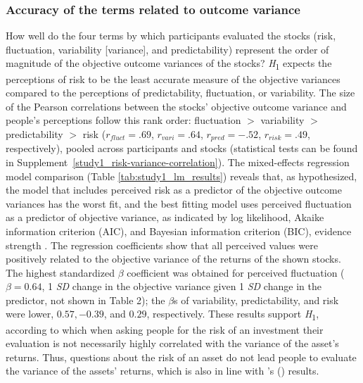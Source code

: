 \documentclass[a4paper,man, natbib,floatsintext]{apa6} %
\begin{document}
\subsubsection{Accuracy of the terms related to outcome variance}
How well do the four terms by which participants evaluated the stocks (risk, fluctuation, variability [variance], and  predictability) represent the order of magnitude of the objective outcome variances of the stocks? \textit{H}\textsubscript{1} expects the perceptions of risk to be the least accurate measure of the objective variances compared to the perceptions of predictability, fluctuation, or variability. The size of the Pearson correlations between the stocks' objective outcome variance and people's perceptions follow this rank order: fluctuation $>$ variability $>$ predictability $>$ risk ($r_{fluct}=.69$, $r_{vari}=.64$, $r_{pred}= -.52$, $r_{risk}= .49$, respectively), pooled across participants and stocks (statistical tests can be found in Supplement~\ref{study1_risk-variance-correlation}). The mixed-effects regression model comparison (Table \ref{tab:study1_lm_results}) reveals that, as hypothesized, the model that includes perceived risk as a predictor of the objective outcome variances has the worst fit, and the best fitting model uses perceived fluctuation as a predictor of objective variance, as indicated by log likelihood, Akaike information criterion (AIC), and Bayesian information criterion (BIC), evidence strength \citep[the best model has an AIC weight of 1; see][]{Wagenmakers2004}. The regression coefficients show that all perceived values were positively related to the objective variance of the returns of the shown stocks. The highest standardized $\beta$ coefficient was obtained for perceived fluctuation ($\beta = 0.64$, 1 \textit{SD} change in the objective variance given 1 \textit{SD} change in the predictor, not shown in Table 2); the $\beta$s of variability, predictability, and risk were lower, $ 0.57, -0.39$, and $0.29$, respectively. These results support \textit{H}\textsubscript{1}, according to which when asking people for the risk of an investment their evaluation is not necessarily highly correlated with the variance of the asset's returns. Thus, questions about the risk of an asset do not lead people to evaluate the variance of the assets' returns, which is also in line with \citeauthor{Klos2005a}'s (\citeyear{Klos2005a}) results.


\end{document}
